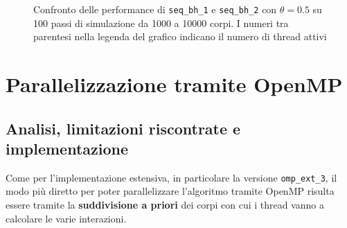 \documentclass[12pt]{report}
\begin{document}
\begin{figure}[H]

        \caption{Confronto delle performance di \texttt{seq\_bh\_1} e \texttt{seq\_bh\_2} con $\theta = 0.5$ su 100 passi di simulazione da 1000 a 10000 corpi. I numeri tra parentesi nella legenda del grafico indicano il numero di thread attivi}
        \label{fig:seq_2_bh_graph}
    \end{figure}

    \newpage

    \section{Parallelizzazione tramite OpenMP}

    \subsection{Analisi, limitazioni riscontrate e implementazione}

    Come per l'implementazione estensiva, in particolare la versione \texttt{omp\_ext\_3}, il modo più diretto per poter parallelizzare l'algoritmo tramite OpenMP risulta essere tramite la \textbf{suddivisione a priori} dei corpi con cui i thread vanno a calcolare le varie interazioni.
    
\end{document}
